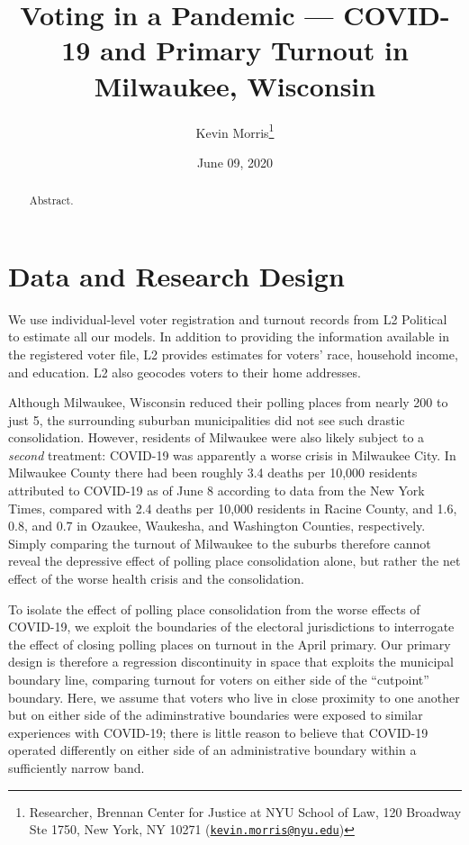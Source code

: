 \documentclass[
  12pt,
]{article}
\title{Voting in a Pandemic --- COVID-19 and Primary Turnout in Milwaukee, Wisconsin}
\author{Kevin Morris\footnote{Researcher, Brennan Center for Justice at NYU School of Law, 120 Broadway Ste 1750, New York, NY 10271 (\href{mailto:kevin.morris@nyu.edu}{\nolinkurl{kevin.morris@nyu.edu}})}}
\date{June 09, 2020}
\begin{document}
\maketitle
\begin{abstract}
Abstract.
\end{abstract}

\pagebreak

\doublespacing

\hypertarget{data-and-research-design}{%
\section*{Data and Research Design}\label{data-and-research-design}}

We use individual-level voter registration and turnout records from L2 Political to estimate all our models. In addition to providing the information available in the registered voter file, L2 provides estimates for voters' race, household income, and education. L2 also geocodes voters to their home addresses.

Although Milwaukee, Wisconsin reduced their polling places from nearly 200 to just 5, the surrounding suburban municipalities did not see such drastic consolidation. However, residents of Milwaukee were also likely subject to a \emph{second} treatment: COVID-19 was apparently a worse crisis in Milwaukee City. In Milwaukee County there had been roughly 3.4 deaths per 10,000 residents attributed to COVID-19 as of June 8 according to data from the New York Times, compared with 2.4 deaths per 10,000 residents in Racine County, and 1.6, 0.8, and 0.7 in Ozaukee, Waukesha, and Washington Counties, respectively. Simply comparing the turnout of Milwaukee to the suburbs therefore cannot reveal the depressive effect of polling place consolidation alone, but rather the net effect of the worse health crisis and the consolidation.

To isolate the effect of polling place consolidation from the worse effects of COVID-19, we exploit the boundaries of the electoral jurisdictions to interrogate the effect of closing polling places on turnout in the April primary. Our primary design is therefore a regression discontinuity in space that exploits the municipal boundary line, comparing turnout for voters on either side of the ``cutpoint'' boundary. Here, we assume that voters who live in close proximity to one another but on either side of the adiminstrative boundaries were exposed to similar experiences with COVID-19; there is little reason to believe that COVID-19 operated differently on either side of an administrative boundary within a sufficiently narrow band.
\end{document}
